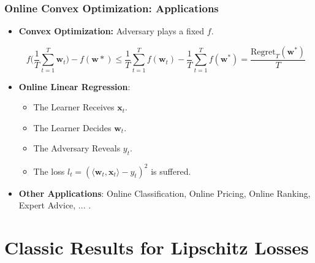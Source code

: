 \documentclass[usenames,dvipsnames, 10pt]{beamer}
\newcommand{\w}{\mathbf{w}}
\newcommand{\x}{\mathbf{x}}
\begin{document}
\begin{frame}
	\frametitle{Online Convex Optimization: Applications}		
	\begin{itemize}		
		\item \textbf{Convex Optimization:} Adversary plays a fixed $f$.
		
		$$f\big(\frac{1}{T}\sum_{t = 1}^{T}\w_t\big) - f(\w*) \leq \frac{1}{T}\sum_{t=1}^{T} f(\w_t) - \frac{1}{T}\sum_{t=1}^{T} f(\w^*) = \frac{\mathrm{Regret}_T(\w^*)}{T}$$
		\pause
		\item \textbf{Online Linear Regression}:
		\begin{itemize}
			\item The Learner Receives $\x_t$.
			\item The Learner Decides $\w_t$.
			\item The Adversary Reveals $y_t$.
			\item The loss $l_t = (\langle \w_t, \x_t\rangle -y_t)^2$ is suffered.
		\end{itemize}
		\pause
		\item \textbf{Other Applications}: Online Classification, Online Pricing, Online Ranking, Expert Advice, ... .
	\end{itemize}			
\end{frame}

\section{Classic Results for Lipschitz Losses}
\end{document}

